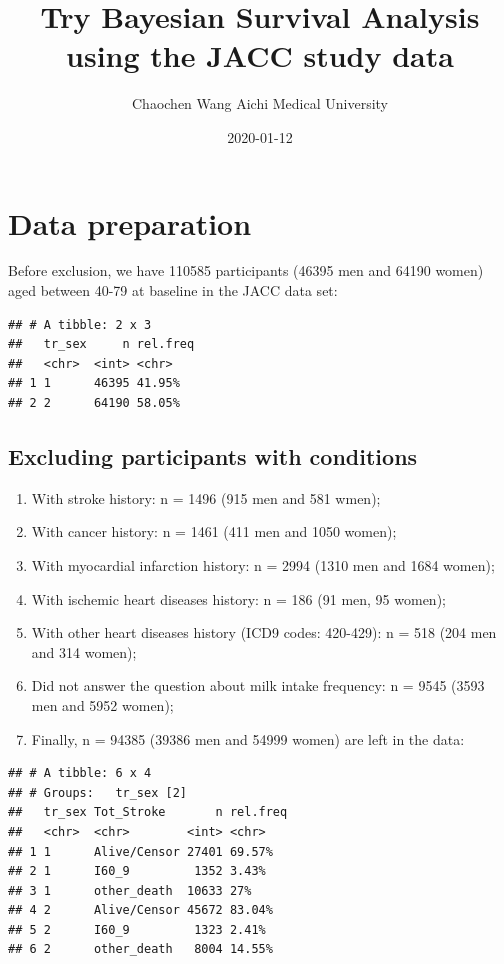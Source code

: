 \documentclass[]{tufte-handout}
\title{Try Bayesian Survival Analysis using the JACC study data}
\author{Chaochen Wang \textbar{} Aichi Medical University}
\date{2020-01-12}
\providecommand{\tightlist}{%
  \setlength{\itemsep}{0pt}\setlength{\parskip}{0pt}}
\begin{document}
\maketitle




\hypertarget{data-preparation}{%
\section{Data preparation}\label{data-preparation}}

Before exclusion, we have 110585 participants (46395 men and 64190
women) aged between 40-79 at baseline in the JACC data set:

\begin{verbatim}
## # A tibble: 2 x 3
##   tr_sex     n rel.freq
##   <chr>  <int> <chr>   
## 1 1      46395 41.95%  
## 2 2      64190 58.05%
\end{verbatim}

\hypertarget{excluding-participants-with-conditions}{%
\subsection{Excluding participants with
conditions}\label{excluding-participants-with-conditions}}

\begin{enumerate}
\def\labelenumi{\arabic{enumi}.}
\tightlist
\item
  With stroke history: n = 1496 (915 men and 581 wmen);
\item
  With cancer history: n = 1461 (411 men and 1050 women);
\item
  With myocardial infarction history: n = 2994 (1310 men and 1684
  women);
\item
  With ischemic heart diseases history: n = 186 (91 men, 95 women);
\item
  With other heart diseases history (ICD9 codes: 420-429): n = 518 (204
  men and 314 women);
\item
  Did not answer the question about milk intake frequency: n = 9545
  (3593 men and 5952 women);
\item
  Finally, n = 94385 (39386 men and 54999 women) are left in the data:
\end{enumerate}

\begin{verbatim}
## # A tibble: 6 x 4
## # Groups:   tr_sex [2]
##   tr_sex Tot_Stroke       n rel.freq
##   <chr>  <chr>        <int> <chr>   
## 1 1      Alive/Censor 27401 69.57%  
## 2 1      I60_9         1352 3.43%   
## 3 1      other_death  10633 27%     
## 4 2      Alive/Censor 45672 83.04%  
## 5 2      I60_9         1323 2.41%   
## 6 2      other_death   8004 14.55%
\end{verbatim}
\end{document}
